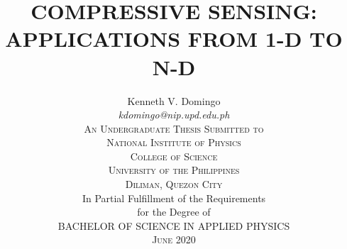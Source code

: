 \documentclass[12pt,oneside]{report}
\begin{document}

\title{
	\Large\uppercase\expandafter{Compressive sensing: Applications from 1-D to N-D
	}
}

\author{
	\large\rm\expandafter{
	Kenneth V. Domingo 
	}\\
	\large\textit{\expandafter{
		kdomingo@nip.upd.edu.ph
	}}\\
	\textsc{An Undergraduate Thesis Submitted to}\\
	\textsc{National Institute of Physics}\\
	\textsc{College of Science}\\
	\textsc{University of the Philippines} \\
	\textsc{Diliman, Quezon City}\\
	\vskip0.25in
	\rm In Partial Fulfillment of the Requirements\\
	\rm for the Degree of\\
	\rm\uppercase\expandafter{Bachelor of Science}
	\rm\uppercase{in}
	\rm\uppercase\expandafter{Applied Physics}\\
	\textsc\expandafter{June 2020}
}

\maketitle
\thispagestyle{titlestyle}




\tableofcontents
\listoffigures
\listoftables

\cleardoublepage
{}

\listofchanges











\appendix

\end{document}
